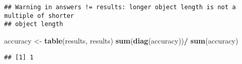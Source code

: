 \documentclass[
]{article}
\newenvironment{Shaded}{\begin{snugshade}}{\end{snugshade}}
\newcommand{\DataTypeTok}[1]{\textcolor[rgb]{0.13,0.29,0.53}{#1}}
\newcommand{\DecValTok}[1]{\textcolor[rgb]{0.00,0.00,0.81}{#1}}
\newcommand{\FloatTok}[1]{\textcolor[rgb]{0.00,0.00,0.81}{#1}}
\newcommand{\KeywordTok}[1]{\textcolor[rgb]{0.13,0.29,0.53}{\textbf{#1}}}
\newcommand{\NormalTok}[1]{#1}
\newcommand{\OperatorTok}[1]{\textcolor[rgb]{0.81,0.36,0.00}{\textbf{#1}}}
\newcommand{\OtherTok}[1]{\textcolor[rgb]{0.56,0.35,0.01}{#1}}
\newcommand{\StringTok}[1]{\textcolor[rgb]{0.31,0.60,0.02}{#1}}
\begin{document}
\begin{Shaded}
\end{Shaded}

\begin{verbatim}
## Warning in answers != results: longer object length is not a multiple of shorter
## object length
\end{verbatim}

\begin{Shaded}
\begin{Highlighting}[]
\NormalTok{accuracy <-}\StringTok{ }\KeywordTok{table}\NormalTok{(results, results)}
\KeywordTok{sum}\NormalTok{(}\KeywordTok{diag}\NormalTok{(accuracy))}\OperatorTok{/}\StringTok{ }\KeywordTok{sum}\NormalTok{(accuracy)}
\end{Highlighting}
\end{Shaded}

\begin{verbatim}
## [1] 1
\end{verbatim}
\end{document}

